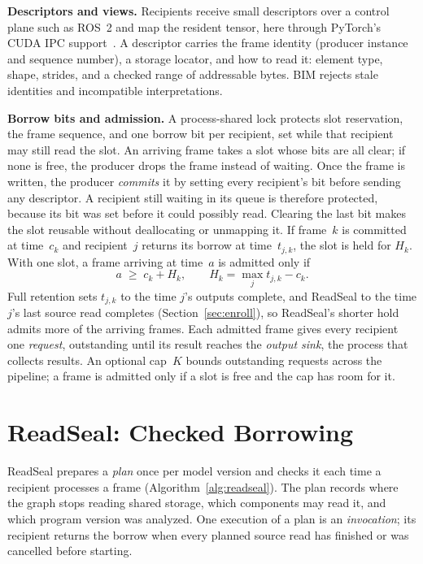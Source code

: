 \documentclass[conference]{IEEEtran}
\begin{document}
\textbf{Descriptors and views.} Recipients receive small descriptors over a control plane such as ROS~2 and map the resident tensor, here through PyTorch's CUDA IPC support~\cite{torchmp}. A descriptor carries the frame identity (producer instance and sequence number), a storage locator, and how to read it: element type, shape, strides, and a checked range of addressable bytes. BIM rejects stale identities and incompatible interpretations.

\textbf{Borrow bits and admission.} A process-shared lock protects slot reservation, the frame sequence, and one borrow bit per recipient, set while that recipient may still read the slot. An arriving frame takes a slot whose bits are all clear; if none is free, the producer drops the frame instead of waiting. Once the frame is written, the producer \emph{commits} it by setting every recipient's bit before sending any descriptor. A recipient still waiting in its queue is therefore protected, because its bit was set before it could possibly read. Clearing the last bit makes the slot reusable without deallocating or unmapping it. If frame~$k$ is committed at time~$c_k$ and recipient~$j$ returns its borrow at time~$t_{j,k}$, the slot is held for $H_k$. With one slot, a frame arriving at time~$a$ is admitted only if
\begin{equation}
a\;\ge\; c_k+H_k, \qquad H_k=\max_j t_{j,k}-c_k. \label{eq:hold}
\end{equation}
Full retention sets $t_{j,k}$ to the time $j$'s outputs complete, and ReadSeal to the time $j$'s last source read completes (Section~\ref{sec:enroll}), so ReadSeal's shorter hold admits more of the arriving frames. Each admitted frame gives every recipient one \emph{request}, outstanding until its result reaches the \emph{output sink}, the process that collects results. An optional cap~$K$ bounds outstanding requests across the pipeline; a frame is admitted only if a slot is free and the cap has room for it.

\section{ReadSeal: Checked Borrowing}
\label{sec:readseal}

ReadSeal prepares a \emph{plan} once per model version and checks it each time a recipient processes a frame (Algorithm~\ref{alg:readseal}). The plan records where the graph stops reading shared storage, which components may read it, and which program version was analyzed. One execution of a plan is an \emph{invocation}; its recipient returns the borrow when every planned source read has finished or was cancelled before starting.
\end{document}
